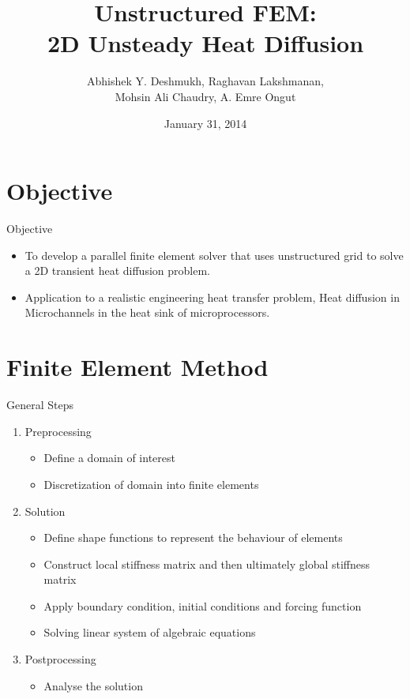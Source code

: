\documentclass[t,english]{beamer}
\title[]{Unstructured FEM:\\ 2D Unsteady Heat Diffusion}
\author{Abhishek Y. Deshmukh, Raghavan Lakshmanan, \\Mohsin Ali Chaudry, A. Emre Ongut}
\date{January 31, 2014}
\begin{document}
\maketitle


\section{Objective}

\begin{frame}[c]{Objective}
\begin{itemize}
\item To develop a parallel finite element solver that uses unstructured grid to solve a 2D transient heat diffusion problem.

\item Application to a realistic engineering heat transfer problem, Heat diffusion in Microchannels in the heat sink of microprocessors.
\end{itemize}

\end{frame}

\section{Finite Element Method}

\begin{frame}[c]{General Steps}

\begin{enumerate}
\item Preprocessing
	\begin{itemize}
	\item Define a domain of interest
	\item Discretization of domain into finite elements 
	\end{itemize}
\item Solution
	\begin{itemize}
	\item Define shape functions to represent the behaviour of elements
	\item Construct local stiffness matrix and then ultimately global stiffness matrix
	\item Apply boundary condition, initial conditions and forcing function
	\item Solving linear system of algebraic equations
	\end{itemize}
\item Postprocessing
	\begin{itemize}
	\item Analyse the solution
	\end{itemize}
\end{enumerate}
\end{frame}
\end{document}
